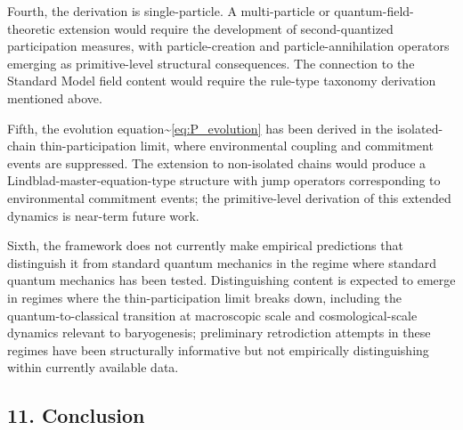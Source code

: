 \documentclass[
  11pt,
]{article}
\begin{document}
Fourth, the derivation is single-particle. A multi-particle or
quantum-field-theoretic extension would require the development of
second-quantized participation measures, with particle-creation and
particle-annihilation operators emerging as primitive-level structural
consequences. The connection to the Standard Model field content would
require the rule-type taxonomy derivation mentioned above.

Fifth, the evolution equation\textasciitilde{}\eqref{eq:P_evolution} has
been derived in the isolated-chain thin-participation limit, where
environmental coupling and commitment events are suppressed. The
extension to non-isolated chains would produce a
Lindblad-master-equation-type structure with jump operators
corresponding to environmental commitment events; the primitive-level
derivation of this extended dynamics is near-term future work.

Sixth, the framework does not currently make empirical predictions that
distinguish it from standard quantum mechanics in the regime where
standard quantum mechanics has been tested. Distinguishing content is
expected to emerge in regimes where the thin-participation limit breaks
down, including the quantum-to-classical transition at macroscopic scale
and cosmological-scale dynamics relevant to baryogenesis; preliminary
retrodiction attempts in these regimes have been structurally
informative but not empirically distinguishing within currently
available data.

\subsection{11. Conclusion}\label{conclusion}
\end{document}
